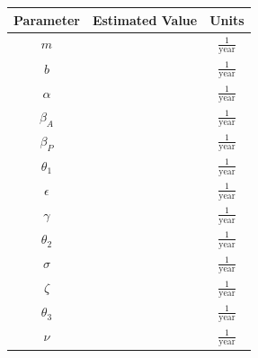 \documentclass[12pt]{article}
\begin{document}
\begin{center}

\begin{tabular}{|c | c | c|}

 \hline

{Parameter} & {Estimated Value} & {Units} \\ [0.5ex]

 \hline

$m$ &  & $\frac{1}{\text{year}}$ \\

\hline

$b$ &  &  $\frac{1}{\text{year}}$\\

\hline

$\alpha$ &  & $\frac{1}{\text{year}}$  \\

\hline


$\beta_A$&  & $\frac{1}{\text{year}}$  \\

\hline

$\beta_P$ &  & $\frac{1}{\text{year}}$  \\

\hline

$\theta_1$ &  &  $\frac{1}{\text{year}}$  \\

\hline


$\epsilon$ &  & $\frac{1}{\text{year}}$  \\

\hline

$\gamma$ &  & $\frac{1}{\text{year}}$  \\


\hline

$\theta_2$ &  & $\frac{1}{\text{year}}$  \\

 \hline
 $\sigma$ &  & $\frac{1}{\text{year}}$  \\

\hline

$\zeta$ &  &  $\frac{1}{\text{year}}$\\

\hline

$\theta_3$ &  &$\frac{1}{\text{year}}$  \\

\hline

$\nu$ &  &  $\frac{1}{\text{year}}$ \\

\hline


\end{tabular}
\end{center}
\end{document}
